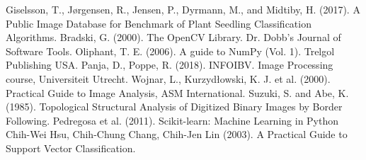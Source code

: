 \documentclass[12pt]{article}
\begin{document}
\newpage
\begin{thebibliography}{}
	 Giselsson, T., Jørgensen, R., Jensen, P., Dyrmann, M., and Midtiby, H. (2017). A Public Image Database for Benchmark of Plant Seedling Classification Algorithms. 
	 Bradski, G. (2000). The OpenCV Library. Dr. Dobb's Journal of Software Tools.
	 Oliphant, T. E. (2006). A guide to NumPy (Vol. 1). Trelgol Publishing USA.
	 Panja, D., Poppe, R. (2018). INFOIBV. Image Processing course, Universiteit Utrecht.
	 Wojnar, L., Kurzydłowski, K. J. et al. (2000). Practical Guide to Image Analysis, ASM International.
	 Suzuki, S. and Abe, K. (1985). Topological Structural Analysis of Digitized Binary Images by Border Following.
	 Pedregosa et al. (2011). Scikit-learn: Machine Learning in Python
	 Chih-Wei Hsu, Chih-Chung Chang, Chih-Jen Lin (2003). A Practical Guide to Support Vector Classification.
\end{thebibliography}
\end{document}
